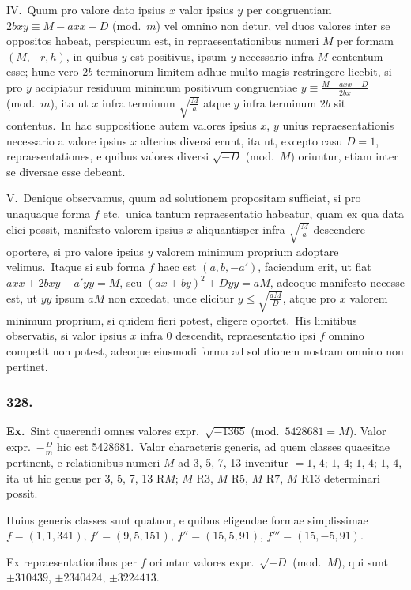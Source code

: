 \documentclass[12pt,a4paper]{article}
\theoremstyle{plain}
\theoremstyle{definition}
\theoremstyle{remark}
\begin{document}
IV.\ Quum pro valore dato ipsius $x$ valor ipsius $y$ per congruentiam
$2bxy\equiv M-axx-D$ (mod.\ $m$) vel omnino non detur, vel duos valores
inter se oppositos habeat, perspicuum est, in repraesentationibus numeri $M$
per formam $(M,-r,h)$, in quibus $y$ est positivus, ipsum $y$ necessario
infra $M$ contentum esse; hunc vero $2b$ terminorum limitem adhuc multo
magis restringere licebit, si pro $y$ accipiatur residuum minimum positivum
congruentiae $y\equiv\frac{M-axx-D}{2bx}$ (mod.\ $m$), ita ut $x$ infra terminum
$\sqrt{\frac{M}{a}}$ atque $y$ infra terminum $2b$ sit contentus.\ In hac suppositione
autem valores ipsius $x$, $y$ unius repraesentationis necessario a valore ipsius
$x$ alterius diversi erunt, ita ut, excepto casu $D=1$, repraesentationes, e
quibus valores diversi $\sqrt{-D}$ (mod.\ $M$) oriuntur, etiam inter se diversae
esse debeant.

V.\ Denique observamus, quum ad solutionem propositam sufficiat,
si pro unaquaque forma $f$ etc.\ unica tantum repraesentatio habeatur,
quam ex qua data elici possit, manifesto valorem ipsius $x$ aliquantisper infra
$\sqrt{\frac{M}{a}}$ descendere oportere, si pro valore ipsius $y$ valorem minimum
proprium adoptare velimus.\ Itaque si sub forma $f$ haec est
$(a,b,-a')$, faciendum erit, ut fiat $axx+2bxy-a'yy=M$, seu
$(ax+by)^2+Dyy=aM$, adeoque manifesto necesse est, ut $yy$ ipsum $aM$
non excedat, unde elicitur $y\leq\sqrt{\frac{aM}{D}}$, atque pro $x$ valorem minimum
proprium, si quidem fieri potest, eligere oportet.\ His limitibus observatis,
si valor ipsius $x$ infra $0$ descendit, repraesentatio ipsi $f$ omnino competit
non potest, adeoque eiusmodi forma ad solutionem nostram omnino non
pertinet.

\subsubsection*{328.}

\textbf{Ex.}\ Sint quaerendi omnes valores expr.\ $\sqrt{-1365}$ (mod.\ $5428681=M$).
Valor expr.\ $-\frac{D}{m}$ hic est 5428681.\ Valor characteris generis, ad quem
classes quaesitae pertinent, e relationibus numeri $M$ ad 3, 5, 7, 13 invenitur
$=1$, $4$; $1$, $4$; $1$, $4$; $1$, $4$, ita ut hic genus per 3, 5, 7, 13
R$M$; $M$ R$3$, $M$ R$5$, $M$ R$7$, $M$ R$13$ determinari possit.

Huius generis classes sunt quatuor, e quibus eligendae formae simplissimae
$f=(1,1,341)$, $f'=(9,5,151)$, $f''=(15,5,91)$, $f'''=(15,-5,91)$.

Ex repraesentationibus per $f$ oriuntur valores expr.\ $\sqrt{-D}$ (mod.\ $M$),
qui sunt $\pm 310439$, $\pm 2340424$, $\pm 3224413$.
\end{document}
